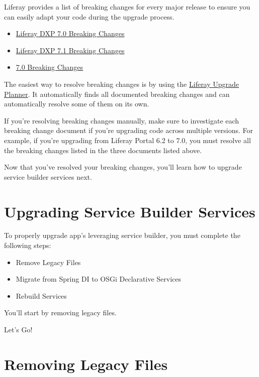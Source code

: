 Liferay provides a list of breaking changes for every major release to
ensure you can easily adapt your code during the upgrade process.

\begin{itemize}
\tightlist
\item
  \href{/docs/7-0/reference/-/knowledge_base/r/breaking-changes}{Liferay
  DXP 7.0 Breaking Changes}
\item
  \href{/docs/7-1/reference/-/knowledge_base/r/breaking-changes}{Liferay
  DXP 7.1 Breaking Changes}
\item
  \href{/docs/7-2/reference/-/knowledge_base/r/breaking-changes}{7.0
  Breaking Changes}
\end{itemize}

The easiest way to resolve breaking changes is by using the
\href{/docs/7-2/reference/-/knowledge_base/r/liferay-upgrade-planner}{Liferay
Upgrade Planner}. It automatically finds all documented breaking changes
and can automatically resolve some of them on its own.

If you're resolving breaking changes manually, make sure to investigate
each breaking change document if you're upgrading code across multiple
versions. For example, if you're upgrading from Liferay Portal 6.2 to
7.0, you must resolve all the breaking changes listed in the three
documents listed above.

Now that you've resolved your breaking changes, you'll learn how to
upgrade service builder services next.

\chapter{Upgrading Service Builder
Services}\label{upgrading-service-builder-services}

To properly upgrade app's leveraging service builder, you must complete
the following steps:

\begin{itemize}
\tightlist
\item
  Remove Legacy Files
\item
  Migrate from Spring DI to OSGi Declarative Services
\item
  Rebuild Services
\end{itemize}

You'll start by removing legacy files.

Let's Go!{}

\chapter{Removing Legacy Files}\label{removing-legacy-files}

